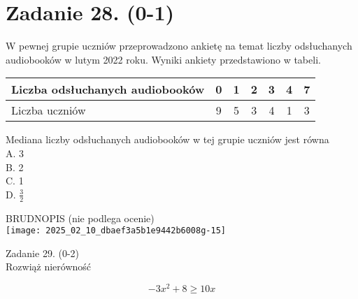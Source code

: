\documentclass[10pt]{article}
\begin{document}
\section*{Zadanie 28. (0-1)}
W pewnej grupie uczniów przeprowadzono ankietę na temat liczby odsłuchanych audiobooków w lutym 2022 roku. Wyniki ankiety przedstawiono w tabeli.

\begin{center}
\begin{tabular}{|l|c|c|c|c|c|c|}
\hline
Liczba odsłuchanych audiobooków & 0 & 1 & 2 & 3 & 4 & 7 \\
\hline
Liczba uczniów & 9 & 5 & 3 & 4 & 1 & 3 \\
\hline
\end{tabular}
\end{center}

Mediana liczby odsłuchanych audiobooków w tej grupie uczniów jest równa\\
A. 3\\
B. 2\\
C. 1\\
D. \(\frac{3}{2}\)

BRUDNOPIS (nie podlega ocenie)\\
\texttt{[image: 2025\_02\_10\_dbaef3a5b1e9442b6008g-15]}

Zadanie 29. (0-2)\\
Rozwiąż nierówność

\[
-3 x^{2}+8 \geq 10 x
\]
\end{document}
